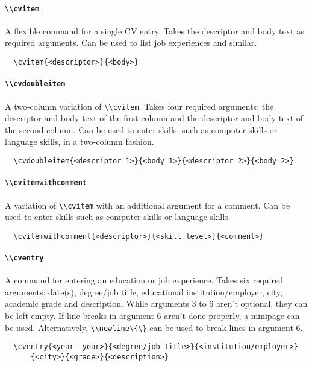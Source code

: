 \documentclass[a4paper, 11pt]{article}
\newcommand{\code}[1]{\lstinline!#1!}
\begin{document}
\paragraph{\code{\\cvitem}}
A flexible command for a single CV entry.
Takes the descriptor and body text as required arguments.
Can be used to list job experiences and similar.
\begin{lstlisting}
  \cvitem{<descriptor>}{<body>}
\end{lstlisting}

\paragraph{\code{\\cvdoubleitem}}
A two-column variation of \code{\\cvitem}.
Takes four required arguments: the descriptor and body text of the first column and the descriptor and body text of the second column.
Can be used to enter skills, such as computer skills or language skills, in a two-column fashion.
\begin{lstlisting}
  \cvdoubleitem{<descriptor 1>}{<body 1>}{<descriptor 2>}{<body 2>}
\end{lstlisting}

\paragraph{\code{\\cvitemwithcomment}}
A variation of \code{\\cvitem} with an additional argument for a comment.
Can be used to enter skills such as computer skills or language skills.
\begin{lstlisting}
  \cvitemwithcomment{<descriptor>}{<skill level>}{<comment>}
\end{lstlisting}

\paragraph{\code{\\cventry}}
A command for entering an education or job experience.
Takes six required arguments: date(s), degree/job title, educational institution/employer, city, academic grade and description.
While arguments 3 to 6 aren't optional, they can be left empty.
If line breaks in argument 6 aren't done properly, a minipage can be used.
Alternatively, \code{\\newline\{\}} can be used to break lines in argument 6.
\begin{lstlisting}
  \cventry{<year--year>}{<degree/job title>}{<institution/employer>}
      {<city>}{<grade>}{<description>}
\end{lstlisting}
\end{document}
